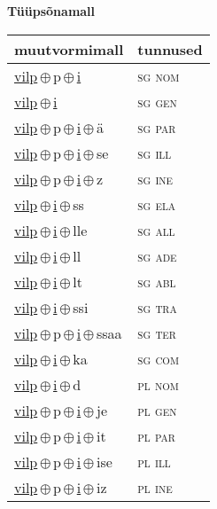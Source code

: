 

\vspace{3.5em}
\noindent \begin{minipage}{\textwidth}
\noindent \textbf{Tüüpsõnamall \,}\\

\begin{sideways}
\begin{tabular}{l l}
muutvormimall & tunnused \\
\hline
\underline{vilp}\,$\oplus$\,p\,$\oplus$\,\underline{i} & \textsc{ sg nom } \\
\underline{vilp}\,$\oplus$\,\underline{i} & \textsc{ sg gen } \\
\underline{vilp}\,$\oplus$\,p\,$\oplus$\,\underline{i}\,$\oplus$\,ä & \textsc{ sg par } \\
\underline{vilp}\,$\oplus$\,p\,$\oplus$\,\underline{i}\,$\oplus$\,se & \textsc{ sg ill } \\
\underline{vilp}\,$\oplus$\,p\,$\oplus$\,\underline{i}\,$\oplus$\,z & \textsc{ sg ine } \\
\underline{vilp}\,$\oplus$\,\underline{i}\,$\oplus$\,ss & \textsc{ sg ela } \\
\underline{vilp}\,$\oplus$\,\underline{i}\,$\oplus$\,lle & \textsc{ sg all } \\
\underline{vilp}\,$\oplus$\,\underline{i}\,$\oplus$\,ll & \textsc{ sg ade } \\
\underline{vilp}\,$\oplus$\,\underline{i}\,$\oplus$\,lt & \textsc{ sg abl } \\
\underline{vilp}\,$\oplus$\,\underline{i}\,$\oplus$\,ssi & \textsc{ sg tra } \\
\underline{vilp}\,$\oplus$\,p\,$\oplus$\,\underline{i}\,$\oplus$\,ssaa & \textsc{ sg ter } \\
\underline{vilp}\,$\oplus$\,\underline{i}\,$\oplus$\,ka & \textsc{ sg com } \\
\underline{vilp}\,$\oplus$\,\underline{i}\,$\oplus$\,d & \textsc{ pl nom } \\
\underline{vilp}\,$\oplus$\,p\,$\oplus$\,\underline{i}\,$\oplus$\,je & \textsc{ pl gen } \\
\underline{vilp}\,$\oplus$\,p\,$\oplus$\,\underline{i}\,$\oplus$\,it & \textsc{ pl par } \\
\underline{vilp}\,$\oplus$\,p\,$\oplus$\,\underline{i}\,$\oplus$\,ise & \textsc{ pl ill } \\
\underline{vilp}\,$\oplus$\,p\,$\oplus$\,\underline{i}\,$\oplus$\,iz & \textsc{ pl ine } \\

\end{tabular}
\end{sideways}
\end{minipage}
